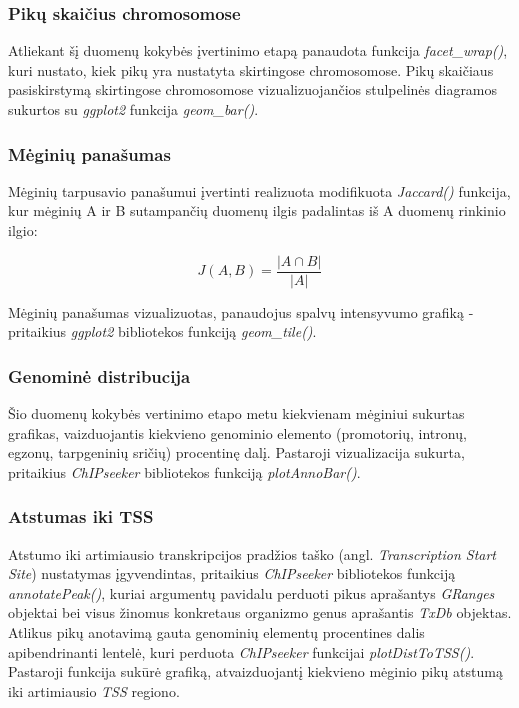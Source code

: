 \documentclass[12pt]{article}
\begin{document}
\subsubsection*{Pikų skaičius chromosomose}
Atliekant šį duomenų kokybės įvertinimo etapą panaudota funkcija
\emph{facet\_wrap()}, kuri nustato, kiek pikų yra nustatyta skirtingose
chromosomose. Pikų skaičiaus pasiskirstymą skirtingose chromosomose
vizualizuojančios stulpelinės diagramos sukurtos su \emph{ggplot2} funkcija
\emph{geom\_bar()}.

\subsubsection*{Mėginių panašumas}
Mėginių tarpusavio panašumui įvertinti realizuota modifikuota
\emph{Jaccard()} funkcija, kur mėginių A ir B sutampančių duomenų ilgis 
padalintas iš A duomenų rinkinio ilgio:

\[ J(A, B) = \frac{|A \cap B|}{|A|} \]

Mėginių panašumas vizualizuotas, panaudojus spalvų intensyvumo grafiką -
pritaikius \emph{ggplot2} bibliotekos funkciją \emph{geom\_tile()}.

\newpage

\subsubsection*{Genominė distribucija}
Šio duomenų kokybės vertinimo etapo metu kiekvienam mėginiui sukurtas grafikas,
vaizduojantis kiekvieno genominio elemento (promotorių, intronų, egzonų,
tarpgeninių sričių) procentinę dalį. Pastaroji vizualizacija sukurta, pritaikius
\emph{ChIPseeker} \cite{CHIPSEEKER} bibliotekos funkciją \emph{plotAnnoBar()}.

\subsubsection*{Atstumas iki TSS}
Atstumo iki artimiausio transkripcijos pradžios taško
(angl. \emph{Transcription Start Site}) nustatymas įgyvendintas, pritaikius
\emph{ChIPseeker} bibliotekos funkciją \emph{annotatePeak()}, kuriai argumentų
pavidalu perduoti pikus aprašantys \emph{GRanges} \cite{GRANGES} objektai bei
visus žinomus konkretaus organizmo genus aprašantis \emph{TxDb} \cite{TXDB_MM}
objektas. Atlikus pikų anotavimą gauta genominių elementų procentines dalis
apibendrinanti lentelė, kuri perduota \emph{ChIPseeker} funkcijai
\emph{plotDistToTSS()}. Pastaroji funkcija sukūrė grafiką, atvaizduojantį
kiekvieno mėginio pikų atstumą iki artimiausio \emph{TSS} regiono.
\end{document}
